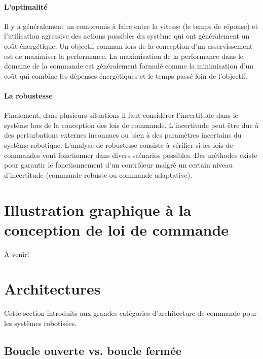 \paragraph{L'optimalité} 

Il y a généralement un compromis à faire entre la vitesse (le temps de réponse) et l'utilisation agressive des actions possibles du système qui ont généralement un coût énergétique. Un objectif commun lors de la conception d'un asservissement est de maximiser la performance. La maximisation de la performance dans le domaine de la commande est généralement formulé comme la minimisation d'un coût qui combine les dépenses énergétiques et le temps passé loin de l'objectif.

\paragraph{La robustesse} Finalement, dans plusieurs situations il faut considérer l'incertitude dans le système lors de la conception des lois de commande. L'incertitude peut être due à des perturbations externes inconnues ou bien à des paramètres incertains du système robotique. L'analyse de robustesse consiste à vérifier si les lois de commandes vont fonctionner dans divers scénarios possibles. Des méthodes existe pour garantir le fonctionnement d'un contrôleur malgré un certain niveau d'incertitude (commande robuste ou commande adaptative).



\section{Illustration graphique à la conception de loi de commande}

À venir!

\section{Architectures}

Cette section introduits aux grandes catégories d'architecture de commande pour les systèmes robotisées. 


\subsection{Boucle ouverte vs. boucle fermée}


